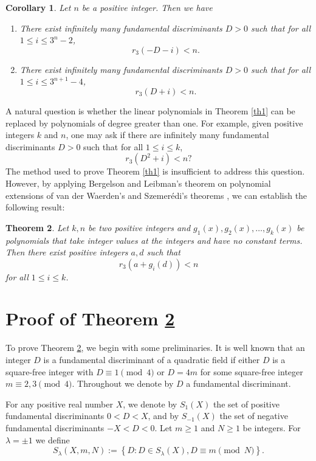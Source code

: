 \documentclass{amsart}
\newtheorem{theorem}{Theorem}[section]
\newtheorem{corollary}[theorem]{Corollary}
\begin{document}
\begin{corollary}
Let $n$ be a positive integer. Then we have
\begin{enumerate}
\item There exist infinitely many fundamental discriminants $D>0$ such that for all $1 \le i \le 3^{n}-2$,
\[
r_3(-D-i)<n.
\]
\item There exist infinitely many fundamental discriminants $D>0$ such that for all $1 \le i \le 3^{n+1}-4$,
\[
r_3(D+i)<n.
\]
\end{enumerate}
\end{corollary}
A natural question is whether the linear polynomials in Theorem \ref{th1} can be replaced by polynomials of degree greater than one. For example, given positive integers $k$ and $n$, one may ask if there are infinitely many fundamental discriminants $D>0$  such that for all $1 \le i \le k$,
\[r_3(D^2+i)<n?\]
The method used to prove Theorem \ref{th1} is insufficient to address this question. However, by applying Bergelson and Leibman's theorem on polynomial extensions of van der Waerden's and Szemerédi's theorems \cite{bl}, we can establish the following result:
\begin{theorem}\label{density}
Let $k, n$ be two positive integers and $g_1(x), g_2(x), \ldots,g_k(x)$ be polynomials that take integer values at the integers and have no constant terms. Then there exist positive integers $a, d$ such that
\[r_3( a+g_i(d) )<n
\]
for all $1\le  i\le k$.
\end{theorem}

\section{Proof of Theorem \ref{density}}

To prove Theorem \ref{density}, we begin with some preliminaries. It is well known that an integer $D$ is a fundamental discriminant  of a quadratic field if either $D$ is a square-free integer with $D \equiv 1 \pmod 4 $ or $D=4m$ for some square-free integer $m \equiv 2, 3 \pmod 4 $. Throughout we denote by $D$ a fundamental discriminant.

For any positive real number $X  $,  we denote by $S_{1}(X)$  the set of positive  fundamental discriminants $0<D<X$, and by  $S_{-1}(X)$ the set of negative  fundamental discriminants  $-X<D<0$. Let $m\ge 1$ and $N \ge1$ be integers. For $\lambda=\pm1$ we define
\[
S_\lambda(X, m, N):=\left\{D: D\in S_\lambda(X),   D \equiv m\pmod N\right\}.
\]
\end{document}

